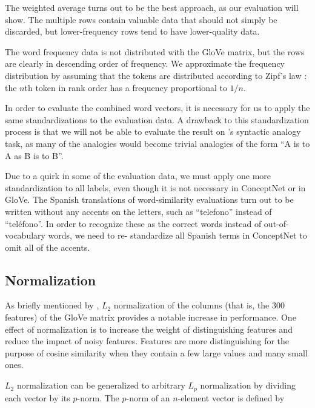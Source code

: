 \documentclass[letterpaper]{article}
\begin{document}

The weighted average turns out to be the best approach, as our evaluation will
show. The multiple rows contain valuable data that should not simply be
discarded, but lower-frequency rows tend to have lower-quality data.

The word frequency data is not distributed with the GloVe matrix, but
the rows are clearly in descending order of frequency. We approximate the
frequency distribution by assuming that the tokens are distributed according to
Zipf's law \cite{zipf1949human}: the $n$th token in rank order has a frequency
proportional to $1/n$.

In order to evaluate the combined word vectors, it is necessary for us to apply
the same standardizations to the evaluation data. A drawback to this
standardization process is that we will not be able to evaluate the result on
's syntactic analogy task, as many of
the analogies would become trivial analogies of the form
``A is to A as B is to B''.

Due to a quirk in some of the evaluation data, we must apply one more
standardization to all labels, even though it is not necessary in ConceptNet or
in GloVe. The Spanish translations of word-similarity evaluations
\cite{hassan2009crosslingual} turn out to be written without any accents on the
letters, such as ``telefono'' instead of ``tel\'{e}fono''. In order to recognize
these as the correct words instead of out-of-vocabulary words, we need to re-
standardize all Spanish terms in ConceptNet to omit all of the accents.


\subsection{Normalization}

As briefly mentioned by , $L_2$ normalization of
the columns (that is, the 300 features) of the GloVe matrix provides a notable
increase in performance. One effect of normalization is to increase the weight
of distinguishing features and reduce the impact of noisy features.  Features
are more distinguishing for the purpose of cosine similarity when they contain
a few large values and many small ones.

$L_2$ normalization can be generalized to arbitrary $L_p$ normalization by
dividing each vector by its $p$-norm. The $p$-norm of an $n$-element vector is
defined by
\end{document}
